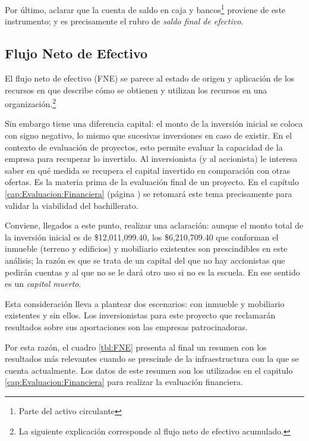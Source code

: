 Por último, aclarar que la cuenta de saldo en caja y bancos\footnote{Parte del activo circulante} proviene de este instrumento; y es precisamente el rubro de \emph{saldo final de efectivo}.



\subsection{Flujo Neto de Efectivo}
\label{sub:FNE}

El flujo neto de efectivo (FNE) se parece al estado de origen y aplicación de los recursos en que describe cómo se obtienen y utilizan los recursos en una organización.\footnote{La siguiente explicación corresponde al flujo neto de efectivo acumulado.}

Sin embargo tiene una diferencia capital: el monto de la inversión inicial se coloca con signo negativo, lo mismo que sucesivas inversiones en caso de existir. En el contexto de evaluación de proyectos, esto permite evaluar la capacidad de la empresa para recuperar lo invertido. Al inversionista (y al accionista) le interesa saber en qué medida se recupera el capital invertido en comparación con otras ofertas. Es la materia prima de la evaluación final de un proyecto. En el capítulo \ref{cap:Evaluacion:Financiera} (página \pageref{cap:Evaluacion:Financiera}) se retomará este tema precisamente para validar la viabilidad del bachillerato.

Conviene, llegados a este punto, realizar una aclaración: aunque el monto total de la inversión inicial es de \$12,011,099.40, los \$6,210,709.40 que conforman el inmueble (terreno y edificios) y mobiliario existentes son prescindibles en este análisis; la razón es que se trata de un capital del que no hay accionistas que pedirán cuentas y al que no se le dará otro uso si no es la escuela. En ese sentido es un \emph{capital muerto}.

Esta consideración lleva a plantear dos escenarios: con inmueble y mobiliario existentes y sin ellos. Los inversionistas para este proyecto que reclamarán resultados sobre sus aportaciones son las empresas patrocinadoras.

Por esta razón, el cuadro \ref{tbl:FNE} presenta al final un resumen con los resultados más relevantes cuando se prescinde de la infraestructura con la que se cuenta actualmente. Los datos de este resumen son los utilizados en el capitulo \ref{cap:Evaluacion:Financiera} para realizar la evaluación financiera.

